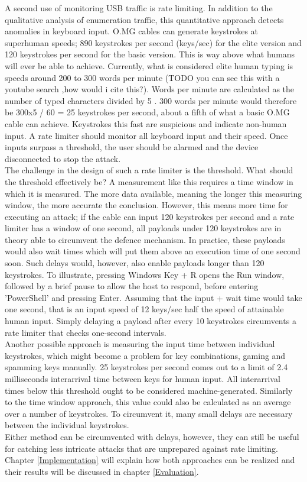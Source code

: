 A second use of monitoring USB traffic is rate limiting. In addition to the qualitative analysis of enumeration traffic, this quantitative approach detects anomalies in keyboard input. O.MG cables can generate keystrokes at superhuman speeds; 890 keystrokes per second (keys/sec) for the elite version and 120 keystrokes per second for the basic version. This is way above what humans will ever be able to achieve. Currently, what is considered elite human typing is speeds around 200 to 300 words per minute (TODO you can see this with a youtube search ,how would i cite this?). Words per minute are calculated as the number of typed characters divided by 5 \cite{travisWhatWordsMinute2015}. 300 words per minute would therefore be 300x5 / 60 = 25 keystrokes per second, about a fifth of what a basic O.MG cable can achieve.
Keystrokes this fast are suspicious and indicate non-human input. A rate limiter should monitor all keyboard input and their speed. Once inputs surpass a threshold, the user should be alarmed and the device disconnected to stop the attack. \\
The challenge in the design of such a rate limiter is the threshold. What should the threshold effectively be? A measurement like this requires a time window in which it is measured. The more data available, meaning the longer this measuring window, the more accurate the conclusion. However, this means more time for executing an attack; if the cable can input 120 keystrokes per second and a rate limiter has a window of one second, all payloads under 120 keystrokes are in theory able to circumvent the defence mechanism. In practice, these payloads would also wait times which will put them above an execution time of one second soon. 
Such delays would, however, also enable payloads longer than 120 keystrokes. To illustrate, pressing Windows Key + R opens the Run window, followed by a brief pause to allow the host to respond, before entering 'PowerShell' and pressing Enter. Assuming that the input + wait time would take one second, that is an input speed of 12 keys/sec half the speed of attainable human input. Simply delaying a payload after every 10 keystrokes circumvents a rate limiter that checks one-second intervals.\\
Another possible approach is measuring the input time between individual keystrokes, which might become a problem for key combinations, gaming and spamming keys manually. 25 keystrokes per second comes out to a limit of 2.4 milliseconds interarrival time between keys for human input. All interarrival times below this threshold ought to be considered machine-generated. Similarly to the time window approach, this value could also be calculated as an average over a number of keystrokes. To circumvent it, many small delays are necessary between the individual keystrokes.\\
Either method can be circumvented with delays, however, they can still be useful for catching less intricate attacks that are unprepared against rate limiting.
Chapter \ref{Implementation} will explain how both approaches can be realized and their results will be discussed in chapter \ref{Evaluation}.


